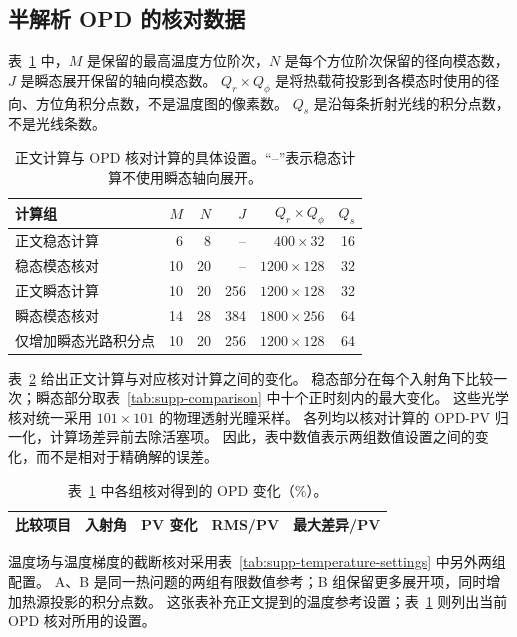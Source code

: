 \documentclass[9pt]{osa-supplemental-document}
\begin{document}
\subsection*{半解析 OPD 的核对数据}
表~\ref{tab:supp-sa-settings} 中，$M$ 是保留的最高温度方位阶次，$N$ 是每个方位阶次保留的径向模态数，$J$ 是瞬态展开保留的轴向模态数。
$Q_r\times Q_\phi$ 是将热载荷投影到各模态时使用的径向、方位角积分点数，不是温度图的像素数。
$Q_s$ 是沿每条折射光线的积分点数，不是光线条数。

\begin{table}[!htbp]\centering\small
\caption{正文计算与 OPD 核对计算的具体设置。“--”表示稳态计算不使用瞬态轴向展开。}\label{tab:supp-sa-settings}
\begin{tabular}{lrrrrr}\toprule
计算组 & $M$ & $N$ & $J$ & $Q_r\times Q_\phi$ & $Q_s$\\\midrule
正文稳态计算 & 6 & 8 & -- & $400\times32$ & 16\\
稳态模态核对 & 10 & 20 & -- & $1200\times128$ & 32\\
正文瞬态计算 & 10 & 20 & 256 & $1200\times128$ & 32\\
瞬态模态核对 & 14 & 28 & 384 & $1800\times256$ & 64\\
仅增加瞬态光路积分点 & 10 & 20 & 256 & $1200\times128$ & 64\\\bottomrule
\end{tabular}
\end{table}

表~\ref{tab:supp-sa-changes} 给出正文计算与对应核对计算之间的变化。
稳态部分在每个入射角下比较一次；瞬态部分取表~\ref{tab:supp-comparison} 中十个正时刻内的最大变化。
这些光学核对统一采用 $101\times101$ 的物理透射光瞳采样。
各列均以核对计算的 OPD-PV 归一化，计算场差异前去除活塞项。
因此，表中数值表示两组数值设置之间的变化，而不是相对于精确解的误差。

\begin{table}[!htbp]\centering\small
\caption{表~\ref{tab:supp-sa-settings} 中各组核对得到的 OPD 变化（\%）。}\label{tab:supp-sa-changes}
\begin{tabular}{lrrrr}\toprule
比较项目 & 入射角 & PV 变化 & RMS/PV & 最大差异/PV\\\midrule

\end{tabular}
\end{table}
温度场与温度梯度的截断核对采用表~\ref{tab:supp-temperature-settings} 中另外两组配置。
A、B 是同一热问题的两组有限数值参考；B 组保留更多展开项，同时增加热源投影的积分点数。
这张表补充正文提到的温度参考设置；表~\ref{tab:supp-sa-settings} 则列出当前 OPD 核对所用的设置。
\end{document}

